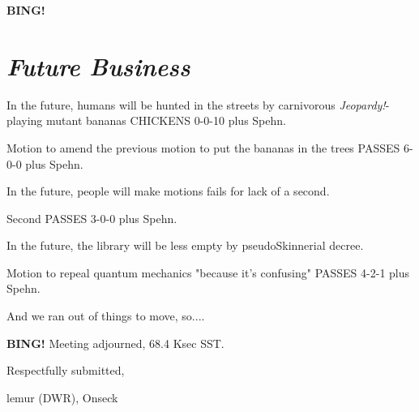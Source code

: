 \documentclass[10pt]{article}
\newcommand{\bing}{{\bf BING!} }
\newcommand{\goto}[1]{\bing \vskip 12pt \section*{{\em{#1}}}}
\newcommand{\ps}{ plus Spehn\xspace}
\newcommand{\onseck}{lemur (DWR), Onseck}
\begin{document}
\goto{Future Business}

In the future, humans will be hunted in the streets by carnivorous
\emph{Jeopardy!}-playing mutant bananas CHICKENS 0-0-10\ps.

Motion to amend the previous motion to put the bananas in the
trees PASSES 6-0-0\ps.

In the future, people will make motions fails for lack of a second.

Second PASSES 3-0-0\ps.

In the future, the library will be less empty by pseudoSkinnerial decree.

Motion to repeal quantum mechanics "because it's confusing" PASSES
4-2-1\ps.

And we ran out of things to move, so....

\bing
\noindent
Meeting adjourned, 68.4 Ksec SST.

\vspace{18pt}

\centerline{Respectfully submitted,}
\centerline{\onseck}
\end{document}

